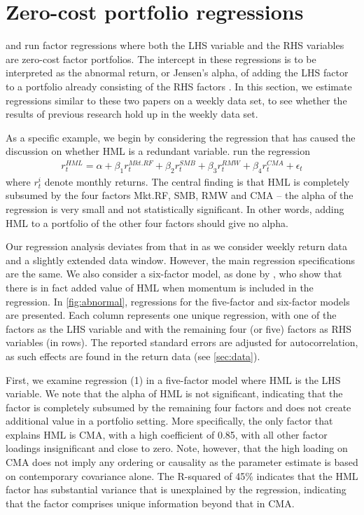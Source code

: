
\section{Zero-cost portfolio regressions}
\label{sec:alpha_reg}
\textcite{FF2015} and \textcite{Asness2015} run factor regressions where both the LHS variable and the RHS variables are zero-cost factor portfolios. The intercept in these regressions is to be interpreted as the abnormal return, or Jensen's alpha, of adding the LHS factor to a portfolio already consisting of the RHS factors \autocite{Jensen1968}. In this section, we estimate regressions similar to these two papers on a weekly data set, to see whether the results of previous research hold up in the weekly data set.

As a specific example, we begin by considering the regression that has caused the discussion on whether HML is a redundant variable. \textcite{FF2015} run the regression
\begin{align}
  r^{HML}_t = \alpha + \beta_1 r^{Mkt.RF}_t + \beta_2 r^{SMB}_t + \beta_3 r^{RMW}_t + \beta_4 r^{CMA}_t + \epsilon_t
\end{align}
where $r^i_t$ denote monthly returns. The central finding is that HML is completely subsumed by the four factors Mkt.RF, SMB, RMW and CMA -- the alpha of the regression is very small and not statistically significant. In other words, adding HML to a portfolio of the other four factors should give no alpha.

Our regression analysis deviates from that in \textcite{FF2015} as we consider weekly return data and a slightly extended data window. However, the main regression specifications are the same. We also consider a six-factor model, as done by \textcite{Asness2015}, who show that there is in fact added value of HML when momentum is included in the regression. In \autoref{fig:abnormal}, regressions for the five-factor and six-factor models are presented. Each column represents one unique regression, with one of the factors as the LHS variable and with the remaining four (or five) factors as RHS variables (in rows). The reported standard errors are adjusted for autocorrelation, as such effects are found in the return data (see \autoref{sec:data}).

First, we examine regression (1) in a five-factor model where HML is the LHS variable. We note that the alpha of HML is not significant, indicating that the factor is completely subsumed by the remaining four factors and does not create additional value in a portfolio setting. More specifically, the only factor that explains HML is CMA, with a high coefficient of 0.85, with all other factor loadings insignificant and close to zero. Note, however, that the high loading on CMA does not imply any ordering or causality as the parameter estimate is based on contemporary covariance alone. The R-squared of 45\% indicates that the HML factor has substantial variance that is unexplained by the regression, indicating that the factor comprises unique information beyond that in CMA.

